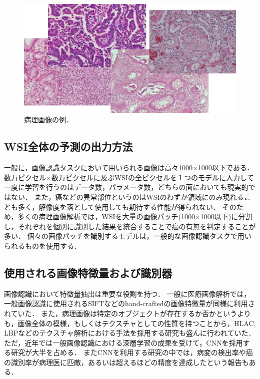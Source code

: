 \begin{figure}[tbp]
    \label{fig:path_images}
     \begin{center}
      \includegraphics[width=13cm]{figures/path_images.png}
     \end{center}
    \caption{病理画像の例．}
\end{figure}
    
\subsection{WSI全体の予測の出力方法}
一般に，画像認識タスクにおいて用いられる画像は高々1000×1000以下である．
数万ピクセル×数万ピクセルに及ぶWSIの全ピクセルを１つのモデルに入力して一度に学習を行うのはデータ数，パラメータ数，どちらの面においても現実的ではない．
また，癌などの異常部位というのはWSIのわずか領域にのみ現れることも多く，解像度を落として使用しても期待する性能が得られない．
そのため，多くの病理画像解析では，WSIを大量の画像パッチ(1000×1000以下)に分割し，それぞれを個別に識別した結果を統合することで癌の有無を判定することが多い．
個々の画像パッチを識別するモデルは，一般的な画像認識タスクで用いられるものを使用する．

\subsection{使用される画像特徴量および識別器}
画像認識において特徴量抽出は重要な役割を持つ．
一般に医療画像解析では，一般画像認識に使用されるSIFTなどのhand-craftedの画像特徴量が同様に利用されていた\cite{caicedo2009histopathology}．
また，病理画像は特定のオブジェクトが存在するか否かというよりも，画像全体の模様，もしくはテクスチャとしての性質を持つことから，HLAC, LBPなどのテクスチャ解析における手法を採用する研究も盛んに行われていた\cite{sertel2008texture, sertel2009histopathological, nosato2011extended}．
ただ，近年では一般画像認識における深層学習の成果を受けて，CNNを採用する研究が大半を占める\cite{hou2016patch, xu2016deep, litjens2016deep, chen2016dcan, liu2017detecting}．
またCNNを利用する研究の中では，病変の検出率\cite{liu2017detecting}や癌の識別率\cite{xu2016deep}が病理医に匹敵，あるいは超えるほどの精度を達成したという報告もある．

